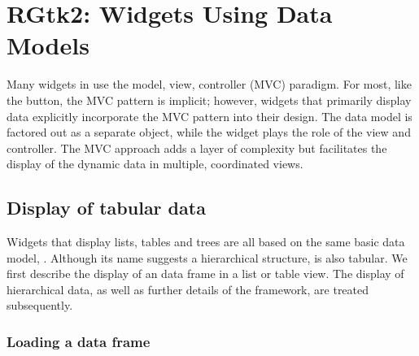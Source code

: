 
\chapter{RGtk2: Widgets Using Data Models}
\label{sec:RGtk2:widgets-with-models}



Many widgets in \GTK\/ use the model, view, controller (MVC)
paradigm. For most, like the button, the MVC pattern is implicit;
however, widgets that primarily display data explicitly incorporate
the MVC pattern into their design. The data model is factored out as a
separate object, while the widget plays the role of the view and
controller. The MVC approach adds a layer of complexity but
facilitates the display of the dynamic data in multiple, coordinated
views.

\section{Display of tabular data}
\label{sec:RGtk2:tabular-heirarchical-data}

Widgets that display lists, tables and trees are all based on the same
basic data model, . Although its name suggests a
hierarchical structure,  is also tabular. We first
describe the display of an \R\/ data frame in a list or table
view. The display of hierarchical data, as well as further details of
the  framework, are treated subsequently.

\subsection{Loading a data frame}
\label{sec:tabular-stores-tree}

